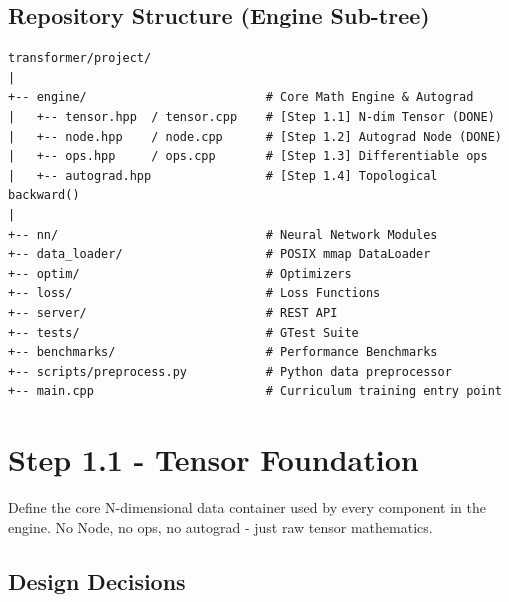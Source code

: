 \documentclass[12pt, a4paper]{article}
\begin{document}
\subsection{Repository Structure (Engine Sub-tree)}

\begin{lstlisting}[language={}, caption={Directory layout for the engine layer}, numbers=none]
transformer/project/
|
+-- engine/                         # Core Math Engine & Autograd
|   +-- tensor.hpp  / tensor.cpp    # [Step 1.1] N-dim Tensor (DONE)
|   +-- node.hpp    / node.cpp      # [Step 1.2] Autograd Node (DONE)
|   +-- ops.hpp     / ops.cpp       # [Step 1.3] Differentiable ops
|   +-- autograd.hpp                # [Step 1.4] Topological backward()
|
+-- nn/                             # Neural Network Modules
+-- data_loader/                    # POSIX mmap DataLoader
+-- optim/                          # Optimizers
+-- loss/                           # Loss Functions
+-- server/                         # REST API
+-- tests/                          # GTest Suite
+-- benchmarks/                     # Performance Benchmarks
+-- scripts/preprocess.py           # Python data preprocessor
+-- main.cpp                        # Curriculum training entry point
\end{lstlisting}

\newpage
\section{Step 1.1 - Tensor Foundation}

\begin{tcolorbox}[designbox, title={Step 1.1 Goal}]
  Define the core N-dimensional data container used by every component in the
  engine.  No Node, no ops, no autograd - just raw tensor mathematics.
\end{tcolorbox}

\subsection{Design Decisions}
\end{document}
